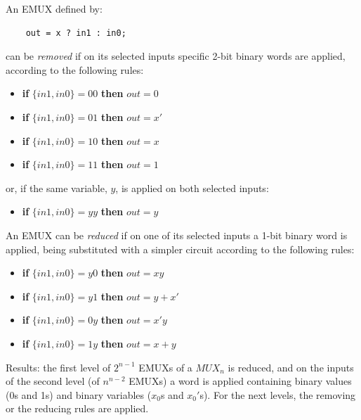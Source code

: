 An EMUX defined by:
\begin{verbatim}
    out = x ? in1 : in0;
\end{verbatim}
can be {\em removed} if on its selected inputs specific 2-bit
binary words are applied,  according to the following rules:
\begin{itemize}
    \item {\bf if} $\{in1, in0\} = 00$ {\bf then} $out = 0$
    \item {\bf if} $\{in1, in0\} = 01$ {\bf then} $out = x'$
    \item {\bf if} $\{in1, in0\} = 10$ {\bf then} $out = x$
    \item {\bf if} $\{in1, in0\} = 11$ {\bf then} $out = 1$
\end{itemize}
or, if the same variable, $y$, is applied on both selected inputs:
\begin{itemize}
    \item {\bf if} $\{in1, in0\} = yy$ {\bf then} $out = y$
\end{itemize}
An EMUX can be {\em reduced} if on one of its selected inputs a
1-bit binary word is applied, being substituted with a simpler
circuit according to the following rules:
\begin{itemize}
    \item {\bf if} $\{in1, in0\} = y0$ {\bf then} $out = xy$
    \item {\bf if} $\{in1, in0\} = y1$ {\bf then} $out = y+x'$
    \item {\bf if} $\{in1, in0\} = 0y$ {\bf then} $out = x'y$
    \item {\bf if} $\{in1, in0\} = 1y$ {\bf then} $out = x+y$
\end{itemize}

Results: the first level of $2^{n-1}$ EMUXs of a $MUX_{n}$ is
reduced, and on the inputs of the second level (of $n^{n-2}$
EMUXs) a word is applied containing binary values (0s and 1s) and
binary variables ($x_{0}$s and $x_{0}'$s). For the next levels, the
removing or the reducing rules are applied.

